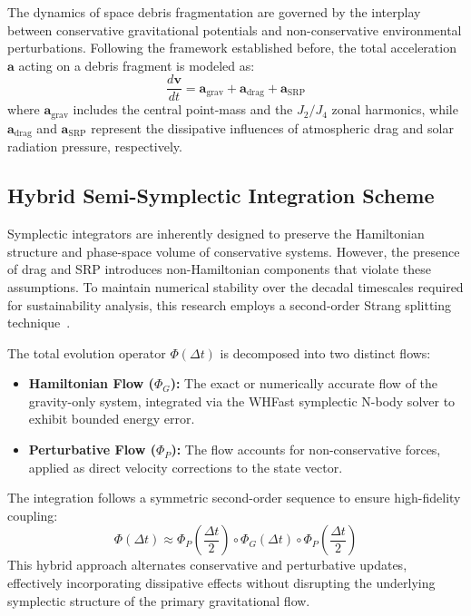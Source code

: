 \documentclass[letterpaper, preprint, 11pt]{AAS}
\begin{document}
The dynamics of space debris fragmentation are governed by the interplay between conservative gravitational potentials and non-conservative environmental perturbations. Following the framework established before, the total acceleration $\mathbf{a}$ acting on a debris fragment is modeled as:
\begin{equation}
    \frac{d\mathbf{v}}{dt} = \mathbf{a}_{\text{grav}} + \mathbf{a}_{\text{drag}} + \mathbf{a}_{\text{SRP}}
\end{equation}
where $\mathbf{a}_{\text{grav}}$ includes the central point-mass and the $J_2/J_4$ zonal harmonics, while $\mathbf{a}_{\text{drag}}$ and $\mathbf{a}_{\text{SRP}}$ represent the dissipative influences of atmospheric drag and solar radiation pressure, respectively.

\subsection{Hybrid Semi-Symplectic Integration Scheme}
Symplectic integrators are inherently designed to preserve the Hamiltonian structure and phase-space volume of conservative systems. However, the presence of drag and SRP introduces non-Hamiltonian components that violate these assumptions. To maintain numerical stability over the decadal timescales required for sustainability analysis, this research employs a second-order Strang splitting technique~\cite{puerta-ibarra_advanced_2025}.

The total evolution operator $\Phi(\Delta t)$ is decomposed into two distinct flows:
\begin{itemize}
    \item \textbf{Hamiltonian Flow ($\Phi_G$):} The exact or numerically accurate flow of the gravity-only system, integrated via the WHFast symplectic N-body solver to exhibit bounded energy error.
    \item \textbf{Perturbative Flow ($\Phi_P$):} The flow accounts for non-conservative forces, applied as direct velocity corrections to the state vector.
\end{itemize}

The integration follows a symmetric second-order sequence to ensure high-fidelity coupling:
\begin{equation}
    \Phi(\Delta t) \approx \Phi_{P}\left(\frac{\Delta t}{2}\right) \circ \Phi_{G}(\Delta t) \circ \Phi_{P}\left(\frac{\Delta t}{2}\right)
\end{equation}
This hybrid approach alternates conservative and perturbative updates, effectively incorporating dissipative effects without disrupting the underlying symplectic structure of the primary gravitational flow.
\end{document}
